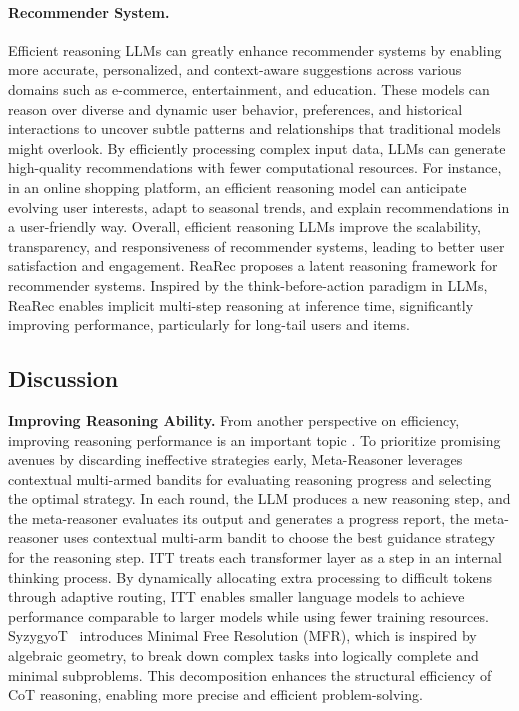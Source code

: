 \paragraph{Recommender System.} Efficient reasoning LLMs can greatly enhance recommender systems by enabling more accurate, personalized, and context-aware suggestions across various domains such as e-commerce, entertainment, and education. These models can reason over diverse and dynamic user behavior, preferences, and historical interactions to uncover subtle patterns and relationships that traditional models might overlook. By efficiently processing complex input data, LLMs can generate high-quality recommendations with fewer computational resources. For instance, in an online shopping platform, an efficient reasoning model can anticipate evolving user interests, adapt to seasonal trends, and explain recommendations in a user-friendly way. Overall, efficient reasoning LLMs improve the scalability, transparency, and responsiveness of recommender systems, leading to better user satisfaction and engagement. ReaRec \cite{tang2025think} proposes a latent reasoning framework for recommender systems. Inspired by the think-before-action paradigm in LLMs, ReaRec enables implicit multi-step reasoning at inference time, significantly improving performance, particularly for long-tail users and items. 

\subsection{Discussion}

\textbf{Improving Reasoning Ability.} From another perspective on efficiency, improving reasoning performance is an important topic \cite{chen2025inner, sui2025meta}. To prioritize promising avenues by discarding ineffective strategies early, Meta-Reasoner \cite{sui2025meta} leverages contextual multi-armed bandits for evaluating reasoning progress and selecting the optimal strategy. In each round, the LLM produces a new reasoning step, and the meta-reasoner evaluates its output and generates a progress report, the meta-reasoner uses contextual multi-arm bandit to choose the best guidance strategy for the reasoning step. ITT \cite{chen2025inner} treats each transformer layer as a step in an internal thinking process. By dynamically allocating extra processing to difficult tokens through adaptive routing, ITT enables smaller language models to achieve performance comparable to larger models while using fewer training resources. SyzygyoT~\cite{li2025syzygy} introduces Minimal Free Resolution (MFR), which is inspired by algebraic geometry, to break down complex tasks into logically complete and minimal subproblems. This decomposition enhances the structural efficiency of CoT reasoning, enabling more precise and efficient problem-solving.
 
